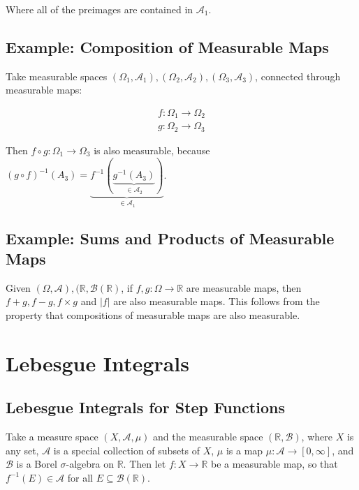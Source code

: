 Where all of the preimages are contained in $\mathscr{A}_1$.


\subsection{Example: Composition of Measurable Maps}

Take measurable spaces $(\Omega_1,\mathscr{A}_1),(\Omega_2,\mathscr{A}_2),(\Omega_3,\mathscr{A}_3)$,  connected through measurable maps:

\begin{equation}
\begin{array}{l}
f: \Omega_1 \rightarrow \Omega_2 \\
g: \Omega_2 \rightarrow \Omega_3
\end{array}
\end{equation}

Then $f \circ g: \Omega_1 \rightarrow \Omega_3$ is also measurable, because $(g\circ f)^{-1}(A_3) = \underbrace{f^{-1}(\underbrace{g^{-1}(A_3)}_{\in \mathscr{A}_2})}_{\in \mathscr{A}_1}$.	 


\subsection{Example: Sums and Products of Measurable Maps}
Given $(\Omega,\mathscr{A}), (\mathbb{R},\mathscr{B}(\mathbb{R})$, if $f,g: \Omega \rightarrow \mathbb{R}$ 	are measurable maps, then $f+g, f-g, f\times g$ and $|f|$ are also measurable maps. This follows from the property that compositions of measurable maps are also measurable.



\section{Lebesgue Integrals}
\subsection{Lebesgue Integrals for Step Functions}
Take a measure space $(X,\mathscr{A}, \mu)$ and the measurable space $(\mathbb{R},\mathscr{B})$, where $X$ is any set, $\mathscr{A}$ is a special collection of subsets of $X$, $\mu$ is a map $\mu: \mathscr{A} \rightarrow [0,\infty]$, and $\mathscr{B}$ is a Borel $\sigma$-algebra on $\mathbb{R}$. Then let $f:X \rightarrow \mathbb{R}$ be a measurable map, so that $f^{-1}(E) \in \mathscr{A}$ for all $E\subseteq \mathscr{B}(\mathbb{R})$. 

